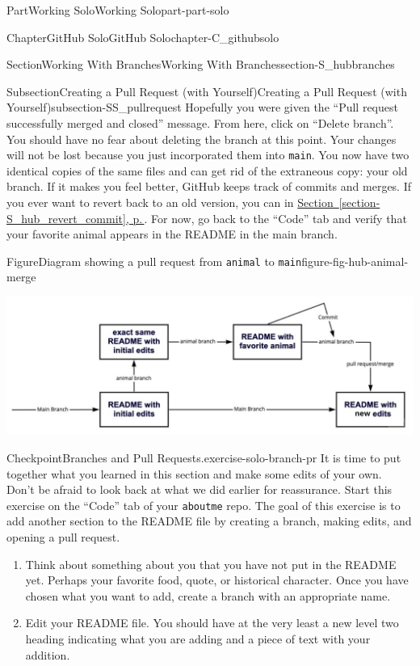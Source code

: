 \documentclass[twoside,10pt,]{book}
\newcommand{\xreffont}{\relax}
\newcommand{\mono}[1]{\texttt{#1}}
\begin{document}
\begin{partptx}{Part}{Working Solo}{}{Working Solo}{}{}{part-part-solo}
\begin{chapterptx}{Chapter}{GitHub Solo}{}{GitHub Solo}{}{}{chapter-C_githubsolo}
\begin{sectionptx}{Section}{Working With Branches}{}{Working With Branches}{}{}{section-S_hubbranches}
\begin{subsectionptx}{Subsection}{Creating a Pull Request (with Yourself)}{}{Creating a Pull Request (with Yourself)}{}{}{subsection-SS_pullrequest}
Hopefully you were given the ``Pull request successfully merged and closed'' message. From here, click on ``Delete branch''. You should have no fear about deleting the branch at this point. Your changes will not be lost because you just incorporated them into \mono{main}. You now have two identical copies of the same files and can get rid of the extraneous copy: your old branch. If it makes you feel better, GitHub keeps track of commits and merges. If you ever want to revert back to an old version, you can in \hyperref[section-S_hub_revert_commit]{Section~{\xreffont\ref{section-S_hub_revert_commit}}, p.\,\pageref{section-S_hub_revert_commit}}. For now, go back to the ``Code'' tab and verify that your favorite animal appears in the README in the main branch.%
\begin{figureptx}{Figure}{Diagram showing a pull request from \mono{animal} to \mono{main}}{figure-fig-hub-animal-merge}{}%
\begin{image}{0.05}{0.9}{0.05}{}%
\includegraphics[width=\linewidth]{external/hub_animal_merge.pdf}
\end{image}%
\tcblower
\end{figureptx}%
\begin{inlineexercise}{Checkpoint}{Branches and Pull Requests.}{exercise-solo-branch-pr}%
It is time to put together what you learned in this section and make some edits of your own. Don't be afraid to look back at what we did earlier for reassurance. Start this exercise on the ``Code'' tab of your \mono{aboutme} repo. The goal of this exercise is to add another section to the README file by creating a branch, making edits, and opening a pull request.%
\begin{enumerate}[font=\bfseries,label=(\alph*),ref=\alph*]%
\item{}Think about something about you that you have not put in the README yet. Perhaps your favorite food, quote, or historical character. Once you have chosen what you want to add, create a branch with an appropriate name.%
\item{}Edit your README file. You should have at the very least a new level two heading indicating what you are adding and a piece of text with your addition.%

\end{enumerate}
\end{inlineexercise}
\end{subsectionptx}
\end{sectionptx}
\end{chapterptx}
\end{partptx}
\end{document}
